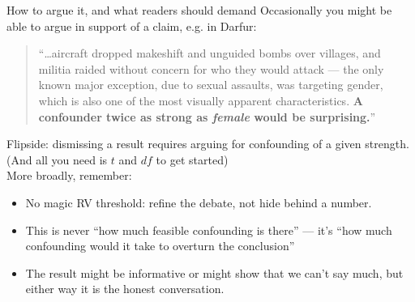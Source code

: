 \documentclass[xcolor=dvipsnames]{beamer}
\newcommand\X{{\bm X}}
\DeclareMathOperator{\df}{df}
\DeclareMathOperator{\rv}{RV}
\begin{document}
\begin{frame}{How to argue it, and what readers should demand}
\small
{} Occasionally you might be able to argue in support of a claim, e.g. in Darfur:
\scriptsize
\begin{quote}
``\dots aircraft dropped makeshift and unguided bombs over villages, and militia raided without concern for who they would attack --- the only known major exception, due to sexual assaults, was targeting gender, which is also one of the most visually apparent characteristics. \textbf{A confounder twice as strong as \textit{female} would be surprising.}''
\end{quote}
\bigskip
\small
{} Flipside: dismissing a result requires arguing for confounding of a given strength. (And all you need is $t$ and $df$ to get started)\\
\bigskip
{} More broadly, remember:
\footnotesize
\begin{itemize}
  \item No magic RV threshold:  refine the debate, not hide behind a number.
  \item This is never ``how much feasible confounding is there'' --- it's ``how much confounding would it take to overturn the conclusion''
  \item The result might be informative or might show that we can't say much, but either way it is the honest conversation.
\end{itemize}
\end{frame}
\end{document}
